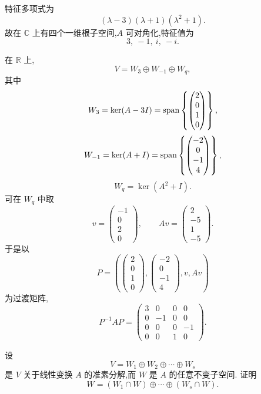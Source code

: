 \begin{solution}
特征多项式为
\[
(\lambda-3)(\lambda+1)(\lambda^2+1).
\]
故在 $\mathbb{C}$ 上有四个一维根子空间,$A$ 可对角化,特征值为
\[
3,\ -1,\ i,\ -i.
\]

在 $\mathbb{R}$ 上,
\[
V=W_3\oplus W_{-1}\oplus W_q,
\]
其中
\[
W_3=\ker(A-3I)
=
\operatorname{span}\left\{
\begin{pmatrix}2\\0\\1\\0\end{pmatrix}
\right\},
\]
\[
W_{-1}=\ker(A+I)
=
\operatorname{span}\left\{
\begin{pmatrix}-2\\0\\-1\\4\end{pmatrix}
\right\},
\]
\[
W_q=\ker(A^2+I).
\]
可在 $W_q$ 中取
\[
v=
\begin{pmatrix}-1\\0\\2\\0\end{pmatrix},
\qquad
Av=
\begin{pmatrix}2\\-5\\1\\-5\end{pmatrix}.
\]
于是以
\[
P=
\left(
\begin{pmatrix}2\\0\\1\\0\end{pmatrix},
\begin{pmatrix}-2\\0\\-1\\4\end{pmatrix},
v,Av
\right)
\]
为过渡矩阵,
\[
\boxed{
P^{-1}AP
=
\begin{pmatrix}
3&0&0&0\\
0&-1&0&0\\
0&0&0&-1\\
0&0&1&0
\end{pmatrix}.
}
\]
\end{solution}


\begin{example}
设
\[
V=W_1\oplus W_2\oplus\cdots\oplus W_s
\]
是 $V$ 关于线性变换 $A$ 的准素分解,而 $W$ 是 $A$ 的任意不变子空间.
证明
\[
W=(W_1\cap W)\oplus\cdots\oplus(W_s\cap W).
\]
\end{example}
\exampleblank

